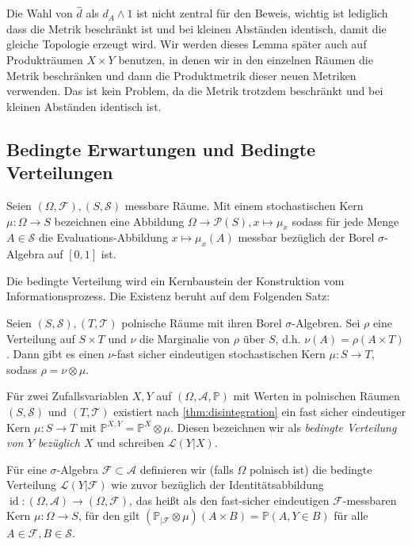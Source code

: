 \begin{remark}
    Die Wahl von $\widehat{d}$ als $d_A \wedge 1$ ist nicht zentral für den Beweis, wichtig ist lediglich dass die Metrik beschränkt ist und bei kleinen Abständen identisch, damit die gleiche Topologie erzeugt wird. Wir werden dieses Lemma später auch auf Produkträumen $X \times Y$ benutzen, in denen wir in den einzelnen Räumen die Metrik beschränken und dann die Produktmetrik dieser neuen Metriken verwenden. Das ist kein Problem, da die Metrik trotzdem beschränkt und bei kleinen Abständen identisch ist.
\end{remark}
\subsection{Bedingte Erwartungen und Bedingte Verteilungen}
\begin{definition}
Seien $(\Omega, \mathcal{F}), (S, \mathcal{S})$ messbare Räume. Mit einem stochastischen Kern $\mu:\Omega \rightarrow S$ bezeichnen eine Abbildung $\Omega \rightarrow \mathcal{P}(S), x\mapsto \mu_x$ sodass für jede Menge $A \in \mathcal{S}$ die Evaluations-Abbildung $x \mapsto \mu_x(A)$ messbar bezüglich der Borel $\sigma$-Algebra auf $[0,1]$ ist.
\end{definition}
Die bedingte Verteilung wird ein Kernbaustein der Konstruktion vom Informationsprozess. Die Existenz beruht auf dem Folgenden Satz:
\begin{theorem}\label{thm:disintegration}
Seien $(S, \mathcal{S}), (T,\mathcal{T})$ polnische Räume mit ihren Borel $\sigma$-Algebren. Sei $\rho$ eine Verteilung auf $S\times T$ und $\nu$ die Marginalie von $\rho$ über $S$, d.h. $\nu(A) = \rho(A\times T)$. Dann gibt es einen $\nu$-fast sicher eindeutigen stochastischen Kern $\mu:S\rightarrow T$, sodass $\rho = \nu \otimes \mu$.
\end{theorem}
\begin{definition}
Für zwei Zufallsvariablen $X, Y$ auf $(\Omega, \mathcal{A}, \mathbb{P})$ mit Werten in polnischen Räumen $(S, \mathcal{S})$ und $(T, \mathcal{T})$ existiert nach \ref{thm:disintegration} ein fast sicher eindeutiger Kern $\mu: S\rightarrow T$ mit $\mathbb{P}^{X, Y}=\mathbb{P}^X\otimes \mu$. Diesen bezeichnen wir als \emph{bedingte Verteilung von $Y$ bezüglich $X$} und schreiben $\mathcal{L}(Y \vert X)$.

Für eine $\sigma$-Algebra $\mathcal{F} \subset \mathcal{A}$ definieren wir (falls $\Omega$ polnisch ist) die bedingte Verteilung $\mathcal{L}(Y\vert \mathcal{F})$ wie zuvor bezüglich der Identitätsabbildung $\operatorname{id}:(\Omega, \mathcal{A}) \rightarrow (\Omega, \mathcal{F})$, das heißt als den fast-sicher eindeutigen $\mathcal{F}$-messbaren Kern $\mu:\Omega\rightarrow S$, für den gilt $\left(\mathbb{P}_{\vert \mathcal{F}} \otimes \mu\right)(A\times B)=\mathbb{P}(A, Y\in B)$ für alle $A \in \mathcal{F}, B\in \mathcal{S}$.
\end{definition}
